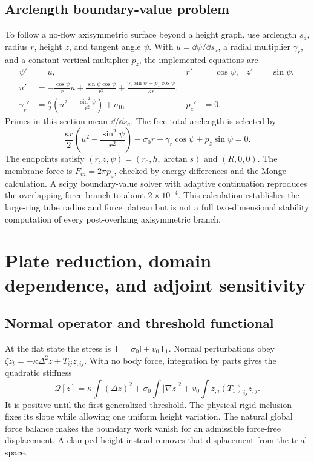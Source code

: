 \subsection{Arclength boundary-value problem}
To follow a no-flow axisymmetric surface beyond a height graph, use arclength $s_a$, radius $r$, height $z$, and tangent angle $\psi$. With $u=\dd\psi/\dd s_a$, a radial multiplier $\gamma_r$, and a constant vertical multiplier $p_z$, the implemented equations are
\begin{align}
\psi'&=u,&r'&=\cos\psi,&z'&=\sin\psi,\\
u'&=-\frac{\cos\psi}{r}u+\frac{\sin\psi\cos\psi}{r^2}
+\frac{\gamma_r\sin\psi-p_z\cos\psi}{\kappa r},\\
\gamma_r'&=\frac{\kappa}{2}\left(u^2-\frac{\sin^2\psi}{r^2}\right)+\sigma_0,&p_z'&=0.
\end{align}
Primes in this section mean $\dd/\dd s_a$. The free total arclength is selected by
\begin{equation}
\frac{\kappa r}{2}\left(u^2-\frac{\sin^2\psi}{r^2}\right)-\sigma_0r+\gamma_r\cos\psi+p_z\sin\psi=0.
\end{equation}
The endpoints satisfy $(r,z,\psi)=(r_0,h,\arctan s)$ and $(R,0,0)$. The membrane force is $F_m=2\pi p_z$, checked by energy differences and the Monge calculation. A scipy boundary-value solver with adaptive continuation reproduces the overlapping force branch to about $2\times10^{-4}$. This calculation establishes the large-ring tube radius and force plateau but is not a full two-dimensional stability computation of every post-overhang axisymmetric branch.

\section{Plate reduction, domain dependence, and adjoint sensitivity}
\subsection{Normal operator and threshold functional}
At the flat state the stress is $\mathsf T=\sigma_0\mathsf I+v_0\mathsf T_1$. Normal perturbations obey $\zeta z_t=-\kappa\Delta^2z+T_{ij}z_{,ij}$. With no body force, integration by parts gives the quadratic stiffness
\begin{equation}
\mathcal Q[z]=\kappa\int(\Delta z)^2+\sigma_0\int|\nabla z|^2+v_0\int z_{,i}(T_1)_{ij}z_{,j}.
\end{equation}
It is positive until the first generalized threshold. The physical rigid inclusion fixes its slope while allowing one uniform height variation. The natural global force balance makes the boundary work vanish for an admissible force-free displacement. A clamped height instead removes that displacement from the trial space.

